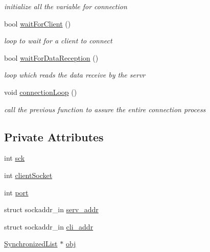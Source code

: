 \begin{DoxyCompactItemize}
\begin{DoxyCompactList}\small\item\em initialize all the variable for connection \end{DoxyCompactList}\item 
bool \hyperlink{class_client_connection_reading_a4cc79a855c8d327ba012f5f659c7a0b8}{wait\-For\-Client} ()
\begin{DoxyCompactList}\small\item\em loop to wait for a client to connect \end{DoxyCompactList}\item 
bool \hyperlink{class_client_connection_reading_a8f52d0e4bc92cf7457a5326b045c72de}{wait\-For\-Data\-Reception} ()
\begin{DoxyCompactList}\small\item\em loop which reads the data receive by the servr \end{DoxyCompactList}\item 
\hypertarget{class_client_connection_reading_a4196083e22b649d351d9ef53d46e904d}{void \hyperlink{class_client_connection_reading_a4196083e22b649d351d9ef53d46e904d}{connection\-Loop} ()}\label{class_client_connection_reading_a4196083e22b649d351d9ef53d46e904d}

\begin{DoxyCompactList}\small\item\em call the previous function to assure the entire connection process \end{DoxyCompactList}\end{DoxyCompactItemize}
\subsection*{Private Attributes}
\begin{DoxyCompactItemize}
\item 
int \hyperlink{class_client_connection_reading_a813a3291adfb953fba1860ea618ee411}{sck}
\item 
int \hyperlink{class_client_connection_reading_af973ddd8409c2bf55e4495f3d05ceea4}{client\-Socket}
\item 
int \hyperlink{class_client_connection_reading_a64caa03b7d63ccbb290fc50727f00a98}{port}
\item 
struct sockaddr\-\_\-in \hyperlink{class_client_connection_reading_a23b735171d7ab01c3693284038d63077}{serv\-\_\-addr}
\item 
struct sockaddr\-\_\-in \hyperlink{class_client_connection_reading_a61439b4c846e3f21dd61ee25db26fdbc}{cli\-\_\-addr}
\item 
\hyperlink{class_synchronized_list}{Synchronized\-List} $\ast$ \hyperlink{class_client_connection_reading_ad160ae11dedf7b566660e6c10d48afae}{obj}
\end{DoxyCompactItemize}


